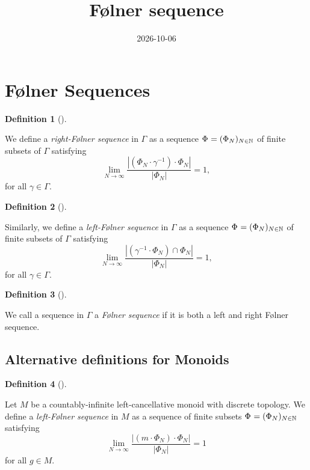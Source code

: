 \documentclass[
  british,
]{article}
\title{Følner sequence}
\author{}
\date{2026-10-06}
\theoremstyle{definition}
\newtheorem{definition}{Definition}[section]
\theoremstyle{plain}
\theoremstyle{remark}
\newcommand{\CountingMeasure}[1]{{\left|#1\right|}}
\newcommand{\Folner}[1][\vphantom{}]{{\Phi}_{#1}}
\newcommand{\Group}{{\Gamma}}
\newcommand{\GroupElement}{{\gamma}}
\newcommand{\GroupOperation}[2]{{#1}\cdot{#2}}
\newcommand{\Inverse}[1]{{#1}^{-1}}
\newcommand{\Monoid}{{M}}
\newcommand{\MonoidElement}{{m}}
\newcommand{\MonoidOperation}[2]{{#1}\cdot{#2}}
\begin{document}
\maketitle


\section{Følner Sequences}\label{fuxf8lner-sequences}

\begin{definition}[]\protect\hypertarget{def-rightFolner}{}\label{def-rightFolner}

We define a \emph{right-Følner sequence} in \(\Group\) as a sequence
\(\Folner =(\Folner[N])_{N\in\mathbb{N}}\) of finite subsets of
\(\Group\) satisfying
\[\lim_{N\rightarrow\infty}\frac{\CountingMeasure{\GroupOperation{(\GroupOperation{\Folner[N]}{\Inverse{\GroupElement}})}{\Folner[N]}}}{\CountingMeasure{\Folner[N]}}=1,\]
for all \(\GroupElement\in\Group\).

\end{definition}

\begin{definition}[]\protect\hypertarget{def-leftFolner}{}\label{def-leftFolner}

Similarly, we define a \emph{left-Følner sequence} in \(\Group\) as a
sequence \(\Folner =(\Folner[N])_{N\in\mathbb{N}}\) of finite subsets of
\(\Group\) satisfying
\[\lim_{N\rightarrow\infty}\frac{\CountingMeasure{(\Inverse{\GroupElement}\cdot\Folner[N])\cap\Folner[N]}}{\CountingMeasure{\Folner[N]}}=1,\]
for all \(\GroupElement\in\Group\).

\end{definition}

\begin{definition}[]\protect\hypertarget{def-Folner}{}\label{def-Folner}

We call a sequence in \(\Group\) a \emph{Følner sequence} if it is both
a left and right Følner sequence.

\end{definition}

\subsection{Alternative definitions for
Monoids}\label{alternative-definitions-for-monoids}

\begin{definition}[]\protect\hypertarget{def-rightFolnerMonoid}{}\label{def-rightFolnerMonoid}

Let \(\Monoid\) be a countably-infinite left-cancellative monoid with
discrete topology. We define a \emph{left-Følner sequence} in
\(\Monoid\) as a sequence of finite subsets
\(\Folner =(\Folner[N])_{N\in\mathbb{N}}\) satisfying
\[\lim_{N\rightarrow\infty}\frac{\CountingMeasure{\MonoidOperation{(\MonoidOperation{\MonoidElement}{\Folner[N]})}{\Folner[N]}}}{\CountingMeasure{\Folner[N]}}=1\]
for all \(g\in M\).

\end{definition}
\end{document}

